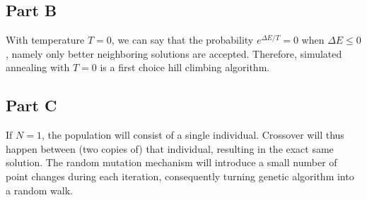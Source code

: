\subsection*{Part B}

With temperature $T=0$, we can say that the probability $e^{\Delta E/T}=0$ when $\Delta E \le 0$, namely only better neighboring solutions are accepted. Therefore, simulated annealing with $T=0$ is a first choice hill climbing algorithm.

\subsection*{Part C}

If $N=1$, the population will consist of a single individual. Crossover will thus happen between (two copies of) that individual, resulting in the exact same solution. The random mutation mechanism will introduce a small number of point changes during each iteration, consequently turning genetic algorithm into a random walk.






